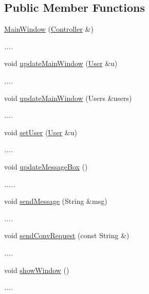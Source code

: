 \subsection*{Public Member Functions}
\begin{DoxyCompactItemize}
\item 
\hyperlink{classMainWindow_aa98e6a2272758a64bdd6d542fdda6e06}{Main\+Window} (\hyperlink{classController}{Controller} \&)
\begin{DoxyCompactList}\small\item\em .... \end{DoxyCompactList}\item 
void \hyperlink{classMainWindow_aca46fe420046167912fae19de334358a}{update\+Main\+Window} (\hyperlink{classClientUser}{User} \&u)
\begin{DoxyCompactList}\small\item\em .... \end{DoxyCompactList}\item 
void \hyperlink{classMainWindow_a078a7cb45c33d3bbc55ef3e3ccd2eba0}{update\+Main\+Window} (Users \&users)
\begin{DoxyCompactList}\small\item\em .... \end{DoxyCompactList}\item 
void \hyperlink{classMainWindow_a77d55fc27823e7ca899419fcc359932b}{set\+User} (\hyperlink{classClientUser}{User} \&u)
\begin{DoxyCompactList}\small\item\em .... \end{DoxyCompactList}\item 
void \hyperlink{classMainWindow_aee2da13588e4e64b36b6c991ef8c54cf}{update\+Message\+Box} ()
\begin{DoxyCompactList}\small\item\em ..... \end{DoxyCompactList}\item 
void \hyperlink{classMainWindow_ae956965b401009f87e56be9ccb3d139f}{send\+Message} (String \&msg)
\begin{DoxyCompactList}\small\item\em .... \end{DoxyCompactList}\item 
void \hyperlink{classMainWindow_ae587df0a90fbf2bc94075e27076e7ad3}{send\+Conv\+Request} (const String \&)
\begin{DoxyCompactList}\small\item\em .... \end{DoxyCompactList}\item 
void \hyperlink{classMainWindow_a04d901dec193f723d5ab3c4a3231b6b8}{show\+Window} ()
\begin{DoxyCompactList}\small\item\em .... \end{DoxyCompactList}\end{DoxyCompactItemize}


